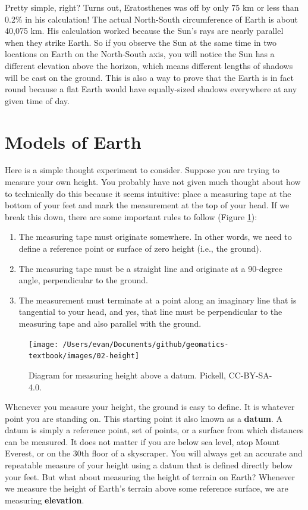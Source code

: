 \documentclass[
]{book}
\providecommand{\tightlist}{%
  \setlength{\itemsep}{0pt}\setlength{\parskip}{0pt}}
\begin{document}
Pretty simple, right? Turns out, Eratosthenes was off by only 75 km or less than 0.2\% in his calculation! The actual North-South circumference of Earth is about 40,075 km. His calculation worked because the Sun's rays are nearly parallel when they strike Earth. So if you observe the Sun at the same time in two locations on Earth on the North-South axis, you will notice the Sun has a different elevation above the horizon, which means different lengths of shadows will be cast on the ground. This is also a way to prove that the Earth is in fact round because a flat Earth would have equally-sized shadows everywhere at any given time of day.

\hypertarget{models-of-earth}{%
\section{Models of Earth}\label{models-of-earth}}

Here is a simple thought experiment to consider. Suppose you are trying to measure your own height. You probably have not given much thought about how to technically do this because it seems intuitive: place a measuring tape at the bottom of your feet and mark the measurement at the top of your head. If we break this down, there are some important rules to follow (Figure \ref{fig:2-height}):

\begin{enumerate}
\def\labelenumi{\arabic{enumi}.}
\tightlist
\item
  The measuring tape must originate somewhere. In other words, we need to define a reference point or surface of zero height (i.e., the ground).
\item
  The measuring tape must be a straight line and originate at a 90-degree angle, perpendicular to the ground.
\item
  The measurement must terminate at a point along an imaginary line that is tangential to your head, and yes, that line must be perpendicular to the measuring tape and also parallel with the ground.
\end{enumerate}

\begin{figure}
\texttt{[image: /Users/evan/Documents/github/geomatics-textbook/images/02-height]} \caption{Diagram for measuring height above a datum. Pickell, CC-BY-SA-4.0.}\label{fig:2-height}
\end{figure}

Whenever you measure your height, the ground is easy to define. It is whatever point you are standing on. This starting point it also known as a \textbf{datum}. A datum is simply a reference point, set of points, or a surface from which distances can be measured. It does not matter if you are below sea level, atop Mount Everest, or on the 30th floor of a skyscraper. You will always get an accurate and repeatable measure of your height using a datum that is defined directly below your feet. But what about measuring the height of terrain on Earth? Whenever we measure the height of Earth's terrain above some reference surface, we are measuring \textbf{elevation}.
\end{document}
